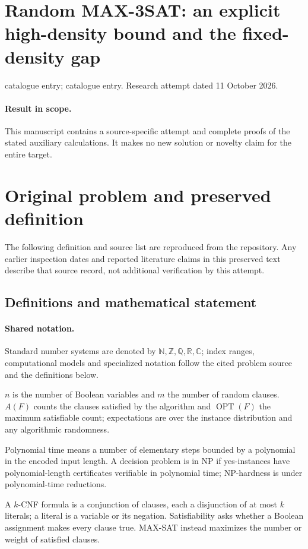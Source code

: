 \documentclass[11pt]{article}
\begin{document}
\section*{Random MAX-3SAT: an explicit high-density bound and the fixed-density gap}
\noindent catalogue entry; catalogue entry. Research attempt dated 11 October 2026.
\paragraph{Result in scope.}This manuscript contains a source-specific attempt and complete proofs of the stated auxiliary calculations. It makes no new solution or novelty claim for the entire target.
\section{Original problem and preserved definition}
The following definition and source list are reproduced from the repository. Any earlier inspection dates and reported literature claims in this preserved text describe that source record, not additional verification by this attempt.
\subsection{Definitions and mathematical statement}

\paragraph{Shared notation.}Standard number systems are denoted by $\mathbb N,\mathbb Z,\mathbb Q,\mathbb R,\mathbb C$; index ranges, computational models and specialized notation follow the cited problem source and the definitions below.


$n$ is the number of Boolean variables and $m$ the number of random clauses. $A(F)$ counts the clauses satisfied by the algorithm and $\operatorname{OPT}(F)$ the maximum satisfiable count; expectations are over the instance distribution and any algorithmic randomness.

Polynomial time means a number of elementary steps bounded by a polynomial in the encoded input length. A decision problem is in $\mathrm{NP}$ if yes-instances have polynomial-length certificates verifiable in polynomial time; NP-hardness is under polynomial-time reductions.

A $k$-CNF formula is a conjunction of clauses, each a disjunction of at most $k$ literals; a literal is a variable or its negation. Satisfiability asks whether a Boolean assignment makes every clause true. MAX-SAT instead maximizes the number or weight of satisfied clauses.
\end{document}
